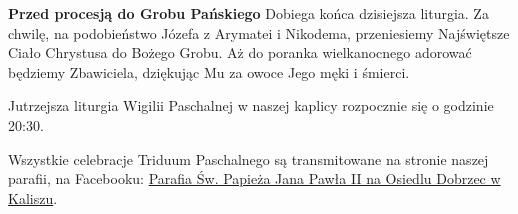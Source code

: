 \documentclass[10pt,oneside,final,notitlepage,a4paper,wide]{mwart}
\begin{document}
	\textbf{Przed procesją do Grobu Pańskiego} Dobiega końca dzisiejsza liturgia. Za chwilę, na podobieństwo Józefa z Arymatei i Nikodema, przeniesiemy Najświętsze Ciało Chrystusa do Bożego Grobu. Aż do poranka wielkanocnego adorować będziemy Zbawiciela, dziękując Mu za owoce Jego męki i śmierci. \bigskip
	
	Jutrzejsza liturgia Wigilii Paschalnej w naszej kaplicy rozpocznie się o godzinie 20:30.
	
	Wszystkie celebracje Triduum Paschalnego są transmitowane na stronie naszej parafii, na Facebooku: \href{https://www.facebook.com/Parafia-\%C5\%9Aw-Papie\%C5\%BCa-Jana-Paw\%C5\%82a-II-na-Osiedlu-Dobrzec-w-Kaliszu-104456801212546/}{Parafia Św. Papieża Jana Pawła II na Osiedlu Dobrzec w Kaliszu}.
\end{document}

